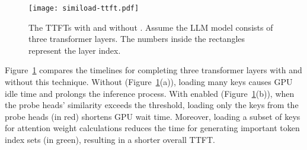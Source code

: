 %

\begin{figure}
	\centering
	\texttt{[image: simiload-ttft.pdf]}
	\caption{The TTFTs with and without \techa{}. Assume the LLM model consists of three transformer layers. The numbers inside the rectangles represent the layer index.}
	\label{fig:simiload-ttft}
\end{figure}


Figure~\ref{fig:simiload-ttft} compares the timelines for completing three transformer layers with and without this technique. 
Without \techa{} (Figure~\ref{fig:simiload-ttft}(a)), loading many keys causes GPU idle time and prolongs the inference process. 
With \techa{} enabled (Figure~\ref{fig:simiload-ttft}(b)), when the probe heads’ similarity exceeds the threshold, loading only the keys from the probe heads (in red) shortens GPU wait time. 
Moreover, loading a subset of keys for attention weight calculations reduces the time for generating important token index sets (in green), resulting in a shorter overall TTFT.


